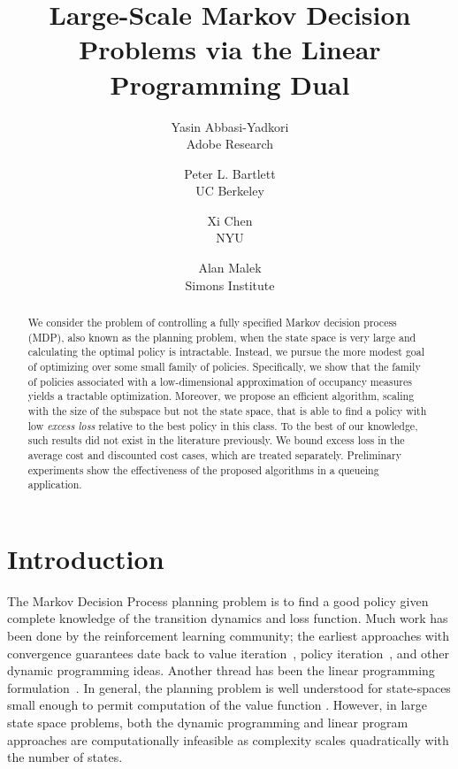 \documentclass[11pt]{article}
\title{Large-Scale Markov Decision Problems via the Linear Programming Dual}
\author{
Yasin Abbasi-Yadkori\\
Adobe Research\\
\and
Peter L. Bartlett \\
UC Berkeley\\
\and
Xi Chen\\
NYU\\
\and
Alan Malek\\
Simons Institute\\
}
\begin{document}
\maketitle


\begin{abstract}
  We consider the problem of controlling a fully specified Markov decision process (MDP), also known as the planning problem, when the state space is very large and calculating the optimal policy is intractable. Instead, we pursue the more modest goal of optimizing over some small family of policies. Specifically, we show that the family of policies associated with a low-dimensional approximation of occupancy measures yields a tractable optimization. Moreover, we propose an efficient algorithm, scaling with the size of the subspace but not the state space, that is able to find a policy with low \emph{excess loss} relative to the best policy in this class. To the best of our knowledge, such results did not exist in the literature previously. We bound excess loss in the average cost and discounted cost cases, which are treated separately. Preliminary experiments show the effectiveness of the proposed algorithms in a queueing application.  
\end{abstract}


\section{Introduction}
The  Markov Decision Process planning problem is to find a good policy given complete knowledge of the transition dynamics and loss function. Much work has been done by the reinforcement learning community; the earliest approaches with convergence guarantees date back to value iteration~\citep{Bellman-1957}, policy iteration~\citep{Howard-1960}, and other dynamic programming ideas. Another thread has been the linear programming formulation~\citep{Manne-1960}. In general, the planning problem is well understood for state-spaces small enough to permit computation of the value function
\citep{Bertsekas-2007}. However, in large state space problems, both the dynamic programming and linear program approaches are computationally infeasible as complexity scales quadratically with the number of states.
\end{document}
